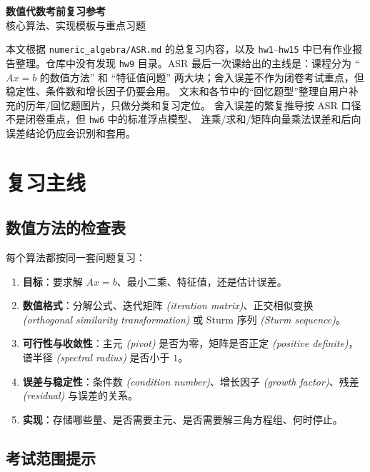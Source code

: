 \documentclass{article}
\newcommand{\eng}[1]{\texorpdfstring{{\normalfont\rmfamily\itshape\textcolor{blue!65!black}{(#1)}}}{(#1)}}
\begin{document}
\pagestyle{fancy}
\fancyhead{}
\rhead{\today}

\begin{center}
  {\Large\bfseries 数值代数考前复习参考}\\[6pt]
  {\large 核心算法、实现模板与重点习题}
\end{center}

\noindent 本文根据 \texttt{numeric\_algebra/ASR.md} 的总复习内容，以及
\texttt{hw1}--\texttt{hw15} 中已有作业报告整理。仓库中没有发现 \texttt{hw9}
目录。ASR 最后一次课给出的主线是：课程分为 ``$Ax=b$ 的数值方法'' 和
``特征值问题'' 两大块；舍入误差不作为闭卷考试重点，但稳定性、条件数和增长因子仍要会用。
文末和各节中的“回忆题型”整理自用户补充的历年/回忆题图片，只做分类和复习定位。
舍入误差的繁复推导按 ASR 口径不是闭卷重点，但 \texttt{hw6} 中的标准浮点模型、
连乘/求和/矩阵向量乘法误差和后向误差结论仍应会识别和套用。

\tableofcontents
\newpage

\section{复习主线}

\subsection{数值方法的检查表}

每个算法都按同一套问题复习：
\begin{enumerate}
  \item \textbf{目标}：要求解 $Ax=b$、最小二乘、特征值，还是估计误差。
  \item \textbf{数值格式}：分解公式、迭代矩阵 \eng{iteration matrix}、正交相似变换
  \eng{orthogonal similarity transformation} 或 Sturm 序列 \eng{Sturm sequence}。
  \item \textbf{可行性与收敛性}：主元 \eng{pivot} 是否为零，矩阵是否正定
  \eng{positive definite}，谱半径 \eng{spectral radius} 是否小于 $1$。
  \item \textbf{误差与稳定性}：条件数 \eng{condition number}、增长因子
  \eng{growth factor}、残差 \eng{residual} 与误差的关系。
  \item \textbf{实现}：存储哪些量、是否需要主元、是否需要解三角方程组、何时停止。
\end{enumerate}

\subsection{考试范围提示}
\end{document}
